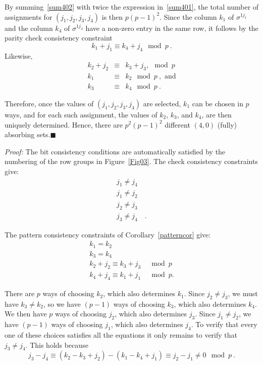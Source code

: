 {By summing~\eqref{sum402} with twice the expression
in~\eqref{sum401}, the total number of assignments for
$(j_1,j_2,j_3,j_4)$ is then $p(p-1)^2$. Since the column $k_1$ of
$\sigma^{1j_1}$ and the column $k_4$ of $\sigma^{1j_4}$ have a
non-zero entry in the same row, it follows by the parity check
consistency constraint
\begin{equation*}
k_1+j_1 \equiv k_4+j_4 \mod p~.
\end{equation*}
Likewise,
\begin{equation*}\begin{array}{cccc}
k_2+j_2 &\equiv &k_3+j_3,  \mod p\\
k_1 &\equiv &k_2 \mod p~, \text{ and}\\
 k_3 &\equiv &k_4\mod p~.
\end{array}\end{equation*}

Therefore, once the values of  $(j_1,j_2,j_3,j_4)$ are selected,
$k_1$ can be chosen in $p$ ways, and for each such assignment, the
values of $k_2$, $k_3$, and $k_4$, are then uniquely determined.
Hence, there are $p^2(p-1)^2$ different $(4,0)$ (fully) absorbing
sets.\hfill$\blacksquare$} %

\noindent \textit{Proof:} The bit consistency conditions are
automatically satisfied by the numbering of the row groups in
Figure~\ref{Fig03}. The check consistency constraints give:
\begin{equation}\begin{array}{ccc}j_1 \neq j_4&{}\\
j_1 \neq j_2 &{}\\
j_2 \neq j_3 &{}\\
j_3 \neq j_4&~.\end{array}
\end{equation}

The pattern consistency constraints of Corollary~\ref{patterncor}
give:
\begin{equation}\begin{array}{ccc} k_1 = k_2 &{}\\
k_3 = k_4 &{}\\
k_2+j_2 \equiv  k_3+ j_3 & \mod p\\
k_4+j_4 \equiv k_1 +j_1 & \mod p.\end{array}
\end{equation}

There are $p$ ways of choosing $k_2$, which also determines $k_1$.
Since $j_2 \neq j_3$, we must have $k_3 \neq k_2$, so we have
$(p-1)$ ways of choosing $k_3$, which also determines $k_4$.  We
then have $p$ ways of choosing $j_2$, which also determines $j_3$.
Since $j_1 \neq j_2$, we have $(p-1)$ ways of choosing $j_1$, which
also determines $j_4$. To verify that every one of these choices
satisfies all the equations it only remains to verify that $j_3 \neq
j_4$. This holds because
\begin{equation}
j_3 -j_4 \equiv (k_2-k_3+j_2)-(k_1-k_4+j_1) \equiv j_2 -j_1 \neq 0
\mod p~.
\end{equation}

